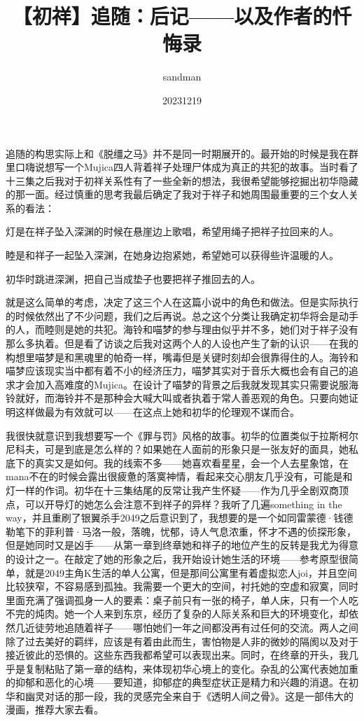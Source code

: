 \documentclass{article}
\title{【初祥】追随：后记——以及作者的忏悔录}
\author{sandman}
\date{20231219}
\begin{document}



\Large

追随的构思实际上和《脱缰之马》并不是同一时期展开的。最开始的时候是我在群里口嗨说想写一个Mujica四人背着祥子处理尸体成为真正的共犯的故事。当时看了十三集之后我对于初祥关系性有了一些全新的想法，我很希望能够挖掘出初华隐藏的那一面。经过慎重的思考我最后确定了我对于祥子和她周围最重要的三个女人关系的看法：



灯是在祥子坠入深渊的时候在悬崖边上歌唱，希望用绳子把祥子拉回来的人。



睦是和祥子一起坠入深渊，在她身边抱紧她，希望她可以获得些许温暖的人。



初华时跳进深渊，把自己当成垫子也要把祥子推回去的人。



就是这么简单的考虑，决定了这三个人在这篇小说中的角色和做法。但是实际执行的时候依然出了不少问题，我们之后再说。总之这个分类让我确定初华将会是动手的人，而睦则是她的共犯。海铃和喵梦的参与理由似乎并不多，她们对于祥子没有那么多执着。但是看了访谈之后我对这两个人的人设也产生了新的认识——在我的构想里喵梦是和黑魂里的帕奇一样，嘴毒但是关键时刻却会很靠得住的人。海铃和喵梦应该现实当中都有着不小的经济压力，喵梦其实对于音乐大概也会有自己的追求才会加入高难度的Mujica。在设计了喵梦的背景之后我就发现其实只需要说服海铃就好，而海铃并不是那种会大喊大叫或者执着于常人善恶观的角色。只要向她证明这样做最为有效就可以——在这点上她和初华的伦理观不谋而合。



我很快就意识到我想要写一个《罪与罚》风格的故事。初华的位置类似于拉斯柯尔尼科夫，可是到底是怎么样的？如果她在人面前的形象只是一张友好的面具，她私底下的真实又是如何。我的线索不多——她喜欢看星星，会一个人去星象馆，在mana不在的时候会露出很疲惫的落寞神情，看起来交心朋友几乎没有，可能是和灯一样的作词。初华在十三集结尾的反常让我产生怀疑——作为几乎全剧双商顶点，可以开导灯的她怎么会注意不到祥子的异样？我听了几遍something in the way，并且重刷了银翼杀手2049之后意识到了，我想要的是一个如同雷蒙德·钱德勒笔下的菲利普·马洛一般，落魄，忧郁，诗人气息浓重，怀才不遇的侦探形象，但是她同时又是凶手——从第一章到终章她和祥子的地位产生的反转是我尤为得意的设计之一。在敲定了她的形象之后，我开始设计她生活的环境——参考原型很简单，就是2049主角K生活的单人公寓，但是那间公寓里有着虚拟恋人joi，并且空间比较狭窄，不容易感到孤独。我需要一个更大的空间，衬托她的空虚和寂寞，同时里面充满了强调孤身一人的要素：桌子前只有一张的椅子，单人床，只有一个人吃不完的炖肉。她一个人来到东京，经历了复杂的人际关系和巨大的环境变化，却依然几近徒劳地追随着祥子——哪怕她们一年之间都没再有过任何的交流。两人之间除了过去美好的羁绊，应该是有着由此而生，害怕物是人非的微妙的隔阂以及对于接近彼此的恐惧的。这些东西我都希望可以表现出来。同时，在终章的开头，我几乎是复制粘贴了第一章的结构，来体现初华心境上的变化。杂乱的公寓代表她加重的抑郁和恶化的心境——要知道，抑郁症的典型症状正是精力和兴趣的消退。在初华和幽灵对话的那一段，我的灵感完全来自于《透明人间之骨》。这是一部伟大的漫画，推荐大家去看。
\end{document}
